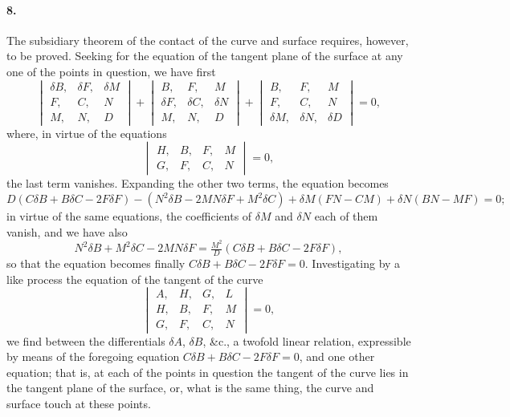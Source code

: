 \documentclass[11pt,a4paper]{article}
\begin{document}
\paragraph{8.}
The subsidiary theorem of the contact of the curve and surface requires, however, to be
proved. Seeking for the equation of the tangent plane of the surface at any one of the
points in question, we have first
\[
\begin{vmatrix}
\delta B, & \delta F, & \delta M \\
F, & C, & N \\
M, & N, & D
\end{vmatrix}
+
\begin{vmatrix}
B, & F, & M \\
\delta F, & \delta C, & \delta N \\
M, & N, & D
\end{vmatrix}
+
\begin{vmatrix}
B, & F, & M \\
F, & C, & N \\
\delta M, & \delta N, & \delta D
\end{vmatrix} = 0,
\]
where, in virtue of the equations
\[
\begin{vmatrix}
H, & B, & F, & M \\
G, & F, & C, & N
\end{vmatrix} = 0,
\]
the last term vanishes. Expanding the other two terms, the equation becomes
\[
D (C \delta B + B \delta C - 2 F \delta F) - (N^2 \delta B - 2 M N \delta F + M^2 \delta C)
+ \delta M (F N - C M) + \delta N (B N - M F) = 0;
\]
in virtue of the same equations, the coefficients of $\delta M$ and $\delta N$ each of them
vanish, and we have also
\[
N^2 \delta B + M^2 \delta C - 2 M N \delta F = \tfrac{M^2}{D}(C \delta B + B \delta C - 2 F \delta F),
\]
so that the equation becomes finally $C \delta B + B \delta C - 2 F \delta F = 0$.
Investigating by a like process the equation of the tangent of the curve
\[
\begin{vmatrix}
A, & H, & G, & L \\
H, & B, & F, & M \\
G, & F, & C, & N
\end{vmatrix} = 0,
\]
we find between the differentials $\delta A$, $\delta B$, \&c., a twofold linear relation,
expressible by means of the foregoing equation $C \delta B + B \delta C - 2 F \delta F = 0$,
and one other equation; that is, at each of the points in question the tangent of the curve
lies in the tangent plane of the surface, or, what is the same thing, the curve and surface
touch at these points.
\end{document}
